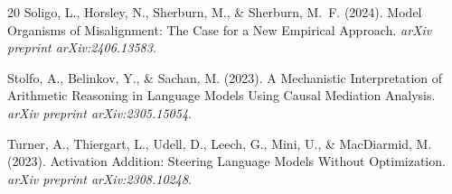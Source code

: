 \documentclass[11pt,a4paper]{article}
\begin{document}
\begin{thebibliography}{20}
Soligo, L., Horsley, N., Sherburn, M., \& Sherburn, M.~F. (2024).
\newblock Model Organisms of Misalignment: The Case for a New Empirical
Approach.
\newblock \textit{arXiv preprint arXiv:2406.13583}.

Stolfo, A., Belinkov, Y., \& Sachan, M. (2023).
\newblock A Mechanistic Interpretation of Arithmetic Reasoning in Language
Models Using Causal Mediation Analysis.
\newblock \textit{arXiv preprint arXiv:2305.15054}.

Turner, A., Thiergart, L., Udell, D., Leech, G., Mini, U., \& MacDiarmid, M. (2023).
\newblock Activation Addition: Steering Language Models Without Optimization.
\newblock \textit{arXiv preprint arXiv:2308.10248}.

\end{thebibliography}
\end{document}
